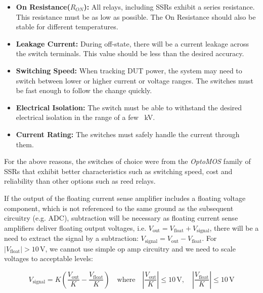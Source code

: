 \begin{itemize}[topsep=8pt,itemsep=4pt,partopsep=4pt, parsep=4pt]

    \item \textbf{On Resistance(\(R_{ON}\)):} All relays, including
    \acp{SSR} exhibit a series resistance.
    This resistance must be as low as possible.
    The On Resistance should also be stable for different temperatures.

    \item \textbf{Leakage Current:} During off-state, there will be a current
    leakage across the switch terminals.
    This value should be less than the desired accuracy.

    \item \textbf{Switching Speed:} When tracking \ac{DUT} power, the
    system may need to switch between lower or higher current or voltage
    ranges.
    The switches must be fast enough to follow the change quickly.

    \item \textbf{Electrical Isolation:} The switch must be able to withstand
    the desired electrical isolation in the range of a few
    \SI{}{\kilo\volt}.

    \item \textbf{Current Rating:} The switches must safely handle the
    current through them.

\end{itemize}

For the above reasons, the switches of choice were from the
\emph{OptoMOS\texttrademark} family of \acp{SSR} that exhibit better
characteristics such as switching speed, cost and reliability than other
options such as reed relays.

If the output of the floating current sense amplifier includes a floating
voltage component, which is not referenced to the same ground as the subsequent
circuitry (e.g. ADC), subtraction will be necessary
as floating current sense amplifiers deliver floating output voltages,
i.e. \( V_{\text{out}} = V_{\text{float}} + V_{\text{signal}} \), there will be
a need to extract the signal by a subtraction:
\( V_{\text{signal}} = V_{\text{out}} - V_{\text{float}} \).
For \(|V_{\text{float}}| > 10 \, \text{V}\), we cannot use simple op amp
circuitry and we need to scale voltages to acceptable levels:


\begin{equation}
    V_{\text{signal}} = K \left( \frac{V_{\text{out}}}{K} - \frac{V_{\text{float}}}{K} \right)
    \quad \text{where} \quad
    \left| \frac{V_{\text{out}}}{K} \right| \leq 10 \, \text{V}, \quad
    \left| \frac{V_{\text{float}}}{K} \right| \leq 10 \, \text{V}
\end{equation}


